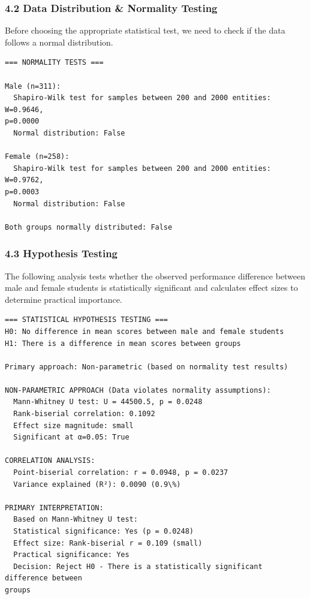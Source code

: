 \documentclass[11pt]{article}
\begin{document}
    \subsubsection{4.2 Data Distribution \& Normality
Testing}\label{data-distribution-normality-testing}

Before choosing the appropriate statistical test, we need to check if
the data follows a normal distribution.

    \begin{Verbatim}[commandchars=\\\{\}]
=== NORMALITY TESTS ===

Male (n=311):
  Shapiro-Wilk test for samples between 200 and 2000 entities: W=0.9646,
p=0.0000
  Normal distribution: False

Female (n=258):
  Shapiro-Wilk test for samples between 200 and 2000 entities: W=0.9762,
p=0.0003
  Normal distribution: False

Both groups normally distributed: False
    \end{Verbatim}

    \subsubsection{4.3 Hypothesis Testing}\label{hypothesis-testing}

The following analysis tests whether the observed performance difference
between male and female students is statistically significant and
calculates effect sizes to determine practical importance.

    \begin{Verbatim}[commandchars=\\\{\}]
=== STATISTICAL HYPOTHESIS TESTING ===
H0: No difference in mean scores between male and female students
H1: There is a difference in mean scores between groups

Primary approach: Non-parametric (based on normality test results)

NON-PARAMETRIC APPROACH (Data violates normality assumptions):
  Mann-Whitney U test: U = 44500.5, p = 0.0248
  Rank-biserial correlation: 0.1092
  Effect size magnitude: small
  Significant at α=0.05: True

CORRELATION ANALYSIS:
  Point-biserial correlation: r = 0.0948, p = 0.0237
  Variance explained (R²): 0.0090 (0.9\%)

PRIMARY INTERPRETATION:
  Based on Mann-Whitney U test:
  Statistical significance: Yes (p = 0.0248)
  Effect size: Rank-biserial r = 0.109 (small)
  Practical significance: Yes
  Decision: Reject H0 - There is a statistically significant difference between
groups
    \end{Verbatim}
\end{document}
